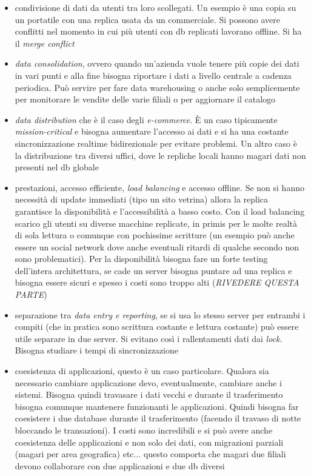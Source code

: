 \documentclass[a4paper,12pt, oneside]{book}
\begin{document}
\begin{itemize}
  \item condivisione di dati da utenti tra loro scollegati. Un esempio è una
  copia su un portatile con una replica usata da un commerciale. Si possono
  avere conflitti nel momento in cui più utenti con db replicati lavorano
  offline. Si ha il \textit{merge conflict}
  \item \textit{data consolidation}, ovvero quando un'azienda vuole tenere più
  copie dei dati in vari punti e alla fine bisogna riportare i dati a livello
  centrale a cadenza periodica. Può servire per fare data warehousing o anche
  solo semplicemente per monitorare le vendite delle varie filiali o per
  aggiornare il catalogo
  \item \textit{data distribution} che è il caso degli \textit{e-commerce}. È un
  caso tipicamente \textit{mission-critical} e bisogna aumentare l'accesso ai
  dati e si ha una costante sincronizzazione realtime bidirezionale per evitare
  problemi. Un altro caso è la distribuzione tra diversi uffici, dove le
  repliche locali hanno magari dati non presenti nel db globale
  \item prestazioni, accesso efficiente, \textit{load balancing} e accesso
  offline. Se non si hanno necessità di update immediati (tipo un sito vetrina)
  allora la replica garantisce la disponibilità e l'accessibilità a basso
  costo. Con il load balancing scarico gli utenti su diverse macchine replicate,
  in primis per le molte realtà di sola lettura o comunque con pochissime
  scritture (un esempio può anche essere un social network dove anche eventuali
  ritardi di qualche secondo non sono problematici). Per la disponibilità
  bisogna fare un forte testing dell'intera architettura, se cade un server
  bisogna puntare ad una replica e bisogna essere sicuri e spesso i costi sono
  troppo alti (\textit{RIVEDERE QUESTA PARTE})
  \item separazione tra \textit{data entry \textnormal{e} reporting}, se si
  usa lo stesso server per entrambi i compiti (che in pratica sono scrittura
  costante e lettura costante) può essere utile separare in due server. Si
  evitano così i rallentamenti dati dai \textit{lock}. Bisogna studiare i tempi
  di sincronizzazione
  \item coesistenza di applicazioni, questo è un caso particolare. Qualora
  sia necessario cambiare applicazione devo, eventualmente, cambiare anche i
  sistemi. Bisogna quindi travasare i dati vecchi e durante il trasferimento
  bisogna comunque mantenere funzionanti le applicazioni. Quindi bisogna far
  coesistere i due database durante il trasferimento (facendo il travaso di
  notte bloccando le transazioni). I costi sono incredibili e si può avere anche
  coesistenza delle applicazioni e non solo dei dati, con migrazioni parziali
  (magari per area geografica) etc$\ldots$ questo comporta che magari due
  filiali devono collaborare con due applicazioni e due db diversi
\end{itemize}
\end{document}
